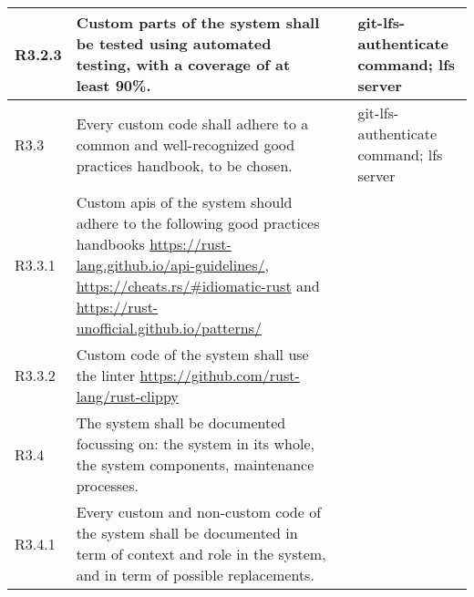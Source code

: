 \begin{landscape}
\begin{longtable}{|p{1cm}|p{19cm}|p{2cm}|p{3cm}|}
        R3.2.3                              & Custom parts of the system shall be tested using automated testing, with a coverage of at least 90\%.                                                                                                                                                                                 &                       & git-lfs-authenticate command; lfs server \\\hline
        \rowcolor[HTML]{DDDDDD}        R3.3 & Every custom code shall adhere to a common and well-recognized good practices handbook, to be chosen.                                                                                                                                                                                 &                       & git-lfs-authenticate command; lfs server \\ \hline
        R3.3.1                              & Custom apis of the system should adhere to the following good practices handbooks \url{https://rust-lang.github.io/api-guidelines/}, \url{https://cheats.rs/#idiomatic-rust} and \url{https://rust-unofficial.github.io/patterns/}                                                    &                       &                                          \\\hline
        R3.3.2                              & Custom code of the system shall use the linter \url{https://github.com/rust-lang/rust-clippy}                                                                                                                                                                                         &                       &                                          \\\hline
        \rowcolor[HTML]{DDDDDD}        R3.4 & The system shall be documented focussing on: the system in its whole, the system components, maintenance processes.                                                                                                                                                                   &                       &                                          \\ \hline
        R3.4.1                              & Every custom and non-custom code of the system shall be documented in term of context and role in the system, and in term of possible replacements.                                                                                                                                   &                       &                                          \\\hline

\end{longtable}
\end{landscape}
